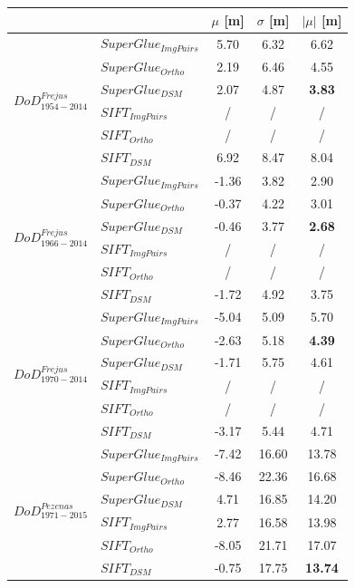 \begin{table}%
	\footnotesize
	\centering
	\begin{tabular}{||l|l|c|c|c||}\hline
		& &$\mu$ [m]&$\sigma$ [m]&$|\mu|$ [m]\\\hline\hline
        \multirow{6}{*}{$DoD^{Frejus}_{1954-2014}$}
&${SuperGlue_{ImgPairs}}$ & 5.70 & 6.32 & 6.62\\
&${SuperGlue_{Ortho}}$ & 2.19 & 6.46 & 4.55\\
&${SuperGlue_{DSM}}$ & 2.07 & 4.87 & \textbf{3.83} \\
&${SIFT_{ImgPairs}}$ & / & / & / \\
&${SIFT_{Ortho}}$ & / & / & / \\
&${SIFT_{DSM}}$ & 6.92 & 8.47 & 8.04\\\hline

\multirow{6}{*}{$DoD^{Frejus}_{1966-2014}$}
&${SuperGlue_{ImgPairs}}$ & -1.36 & 3.82 & 2.90\\
&${SuperGlue_{Ortho}}$ & -0.37 & 4.22 & 3.01\\
&${SuperGlue_{DSM}}$ & -0.46 & 3.77 & \textbf{2.68}\\
&${SIFT_{ImgPairs}}$ & / & / & / \\
&${SIFT_{Ortho}}$ & / & / & / \\
&${SIFT_{DSM}}$ & -1.72 & 4.92 & 3.75\\\hline

\multirow{6}{*}{$DoD^{Frejus}_{1970-2014}$}
&${SuperGlue_{ImgPairs}}$ & -5.04 & 5.09 & 5.70\\
&${SuperGlue_{Ortho}}$ & -2.63 & 5.18 & \textbf{4.39}\\
&${SuperGlue_{DSM}}$ & -1.71 & 5.75 & 4.61\\
&${SIFT_{ImgPairs}}$ & / & / & / \\
&${SIFT_{Ortho}}$ & / & / & / \\
&${SIFT_{DSM}}$ & -3.17 & 5.44 & 4.71\\\hline


\multirow{6}{*}{$DoD^{Pezenas}_{1971-2015}$}
&${SuperGlue_{ImgPairs}}$ & -7.42 & 16.60 & 13.78\\
&${SuperGlue_{Ortho}}$ & -8.46 & 22.36 & 16.68\\
&${SuperGlue_{DSM}}$ & 4.71 & 16.85 & 14.20\\
&${SIFT_{ImgPairs}}$ & 2.77 & 16.58 & 13.98\\
&${SIFT_{Ortho}}$ & -8.05 & 21.71 & 17.07\\
&${SIFT_{DSM}}$ & -0.75 & 17.75 & \textbf{13.74}\\\hline


\end{tabular}
\end{table}
